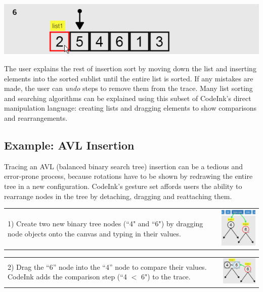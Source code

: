 \noindent \includegraphics[width=0.7\columnwidth]{img/examples/insertion-6.png}

The user explains the rest of insertion sort by moving down the list and
inserting elements into the sorted sublist until the entire list is sorted. If
any mistakes are made, the user can \emph{undo} steps to remove them from the
trace. Many list sorting and searching algorithms can be explained using this
subset of CodeInk's direct manipulation language: creating lists and dragging
elements to show comparisons and rearrangements.

\subsection{Example: AVL Insertion}
Tracing an AVL (balanced binary search tree) insertion can be a tedious and
error-prone process, because rotations have to be shown by redrawing the
entire tree in a new configuration. CodeInk's gesture set affords users the
ability to rearrange nodes in the tree by detaching, dragging and reattaching
them.

\noindent \begin{tabular}{m{4.6cm} m{3.4cm}}

1) Create two new binary tree nodes (``4" and ``6") by dragging node
objects onto the canvas and typing in their values.

& \includegraphics[width=3.4cm]{img/examples/bst-1.png}
\end{tabular}


\noindent \begin{tabular}{m{4.6cm} m{3.4cm}}

2) Drag the ``6'' node into the ``4'' node to compare their values.
CodeInk adds the comparison step (``4 $<$ 6") to the trace.

& \includegraphics[width=3.4cm]{img/examples/bst-2.png}
\end{tabular}

